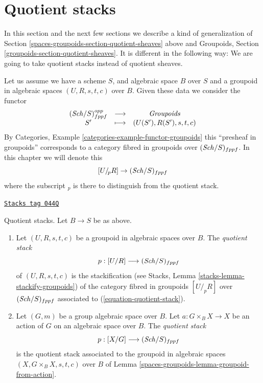 \section{Quotient stacks}
\label{spaces-groupoids-section-stacks}
In this section and the next few sections we describe a kind of
generalization of
Section \ref{spaces-groupoids-section-quotient-sheaves}
above and
Groupoids, Section \ref{groupoids-section-quotient-sheaves}.
It is different in the following way:
We are going to take quotient stacks instead of quotient sheaves.

\medskip\noindent
Let us assume we have a scheme $S$, and algebraic space $B$ over $S$
and a groupoid in algebraic spaces $(U, R, s, t, c)$ over $B$. Given these data
we consider the functor
\begin{equation}
\label{equation-quotient-stack}
\begin{matrix}
(\mathit{Sch}/S)_{fppf}^{opp} &
\longrightarrow &
\textit{Groupoids} \\
S' &
\longmapsto &
(U(S'), R(S'), s, t, c)
\end{matrix}
\end{equation}
By
Categories, Example \ref{categories-example-functor-groupoids}
this ``presheaf in groupoids'' corresponds to a category fibred in groupoids
over $(\mathit{Sch}/S)_{fppf}$. In this chapter we will denote
this
$$
[U/_{\!p}R] \to (\mathit{Sch}/S)_{fppf}
$$
where the subscript ${}_p$ is there to distinguish from the quotient stack.

\begin{definition}
\label{spaces-groupoids-definition-quotient-stack}
\href{https://stacks.math.columbia.edu/tag/044Q}{\texttt{Stacks tag 044Q}}

Quotient stacks. Let $B \to S$ be as above.
\begin{enumerate}
\item Let $(U, R, s, t, c)$ be a groupoid in algebraic spaces over $B$.
The {\it quotient stack}
$$
p : [U/R] \longrightarrow (\mathit{Sch}/S)_{fppf}
$$
of $(U, R, s, t, c)$ is the stackification (see
Stacks, Lemma \ref{stacks-lemma-stackify-groupoids})
of the category fibred in groupoids $[U/_{\!p}R]$ over
$(\mathit{Sch}/S)_{fppf}$ associated to
(\ref{equation-quotient-stack}).
\item Let $(G, m)$ be a group algebraic space over $B$.
Let $a : G \times_B X \to X$ be an action of $G$ on an algebraic space
over $B$. The {\it quotient stack}
$$
p : [X/G] \longrightarrow (\mathit{Sch}/S)_{fppf}
$$
is the quotient stack associated to the groupoid in algebraic spaces
$(X, G \times_B X, s, t, c)$ over $B$ of
Lemma \ref{spaces-groupoids-lemma-groupoid-from-action}.
\end{enumerate}
\end{definition}


